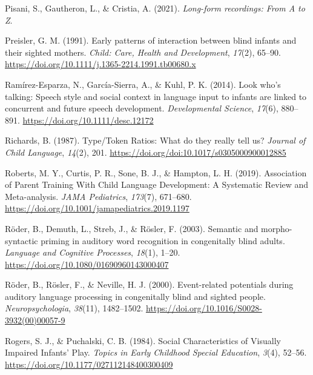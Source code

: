 \documentclass[
  man]{apa6}
\newlength{\cslhangindent}
\newlength{\cslentryspacingunit} %
\newenvironment{CSLReferences}[2] %
 {%
  \setlength{\parindent}{0pt}
  \ifodd #1
  \let\oldpar\par
  \def\par{\hangindent=\cslhangindent\oldpar}
  \fi
  \setlength{\parskip}{#2\cslentryspacingunit}
 }%
 {}
\begin{document}
\begin{CSLReferences}{1}{0}
\leavevmode{}%
Pisani, S., Gautheron, L., \& Cristia, A. (2021). \emph{Long-form recordings: {From A} to {Z}}.

\leavevmode{}%
Preisler, G. M. (1991). Early patterns of interaction between blind infants and their sighted mothers. \emph{Child: Care, Health and Development}, \emph{17}(2), 65--90. \url{https://doi.org/10.1111/j.1365-2214.1991.tb00680.x}

\leavevmode{}%
Ramírez-Esparza, N., García-Sierra, A., \& Kuhl, P. K. (2014). Look who's talking: Speech style and social context in language input to infants are linked to concurrent and future speech development. \emph{Developmental Science}, \emph{17}(6), 880--891. \url{https://doi.org/10.1111/desc.12172}

\leavevmode{}%
Richards, B. (1987). Type/{Token Ratios}: What do they really tell us? \emph{Journal of Child Language}, \emph{14}(2), 201. \url{https://doi.org/doi:10.1017/s0305000900012885}

\leavevmode{}%
Roberts, M. Y., Curtis, P. R., Sone, B. J., \& Hampton, L. H. (2019). Association of {Parent Training With Child Language Development}: {A Systematic Review} and {Meta-analysis}. \emph{JAMA Pediatrics}, \emph{173}(7), 671--680. \url{https://doi.org/10.1001/jamapediatrics.2019.1197}

\leavevmode{}%
Röder, B., Demuth, L., Streb, J., \& Rösler, F. (2003). Semantic and morpho-syntactic priming in auditory word recognition in congenitally blind adults. \emph{Language and Cognitive Processes}, \emph{18}(1), 1--20. \url{https://doi.org/10.1080/01690960143000407}

\leavevmode{}%
Röder, B., Rösler, F., \& Neville, H. J. (2000). Event-related potentials during auditory language processing in congenitally blind and sighted people. \emph{Neuropsychologia}, \emph{38}(11), 1482--1502. \url{https://doi.org/10.1016/S0028-3932(00)00057-9}

\leavevmode{}%
Rogers, S. J., \& Puchalski, C. B. (1984). Social {Characteristics} of {Visually Impaired Infants}' {Play}. \emph{Topics in Early Childhood Special Education}, \emph{3}(4), 52--56. \url{https://doi.org/10.1177/027112148400300409}


\end{CSLReferences}
\end{document}
